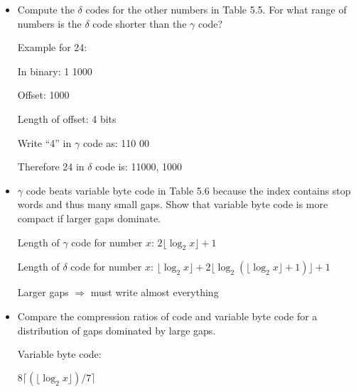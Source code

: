 \documentclass[12pt]{article}
\begin{document}
\begin{itemize}
  \item Compute the $\delta$ codes for the other numbers in Table 5.5. 
	 For what range of numbers is the $\delta$ code shorter than the $\gamma$ code? 

	 Example for 24: 

	 In binary: 1 1000

	 Offset: 1000

	 Length of offset: 4 bits

	 Write ``4'' in $\gamma$ code as: 110 00

	 Therefore 24 in $\delta$ code is: 11000, 1000
  \item $\gamma$ code beats variable byte code in Table 5.6 because the index contains stop 
	 words and thus many small gaps. 
 	 Show that variable byte code is more compact if larger gaps dominate. 

	 Length of $\gamma$ code for number $x$: $2\lfloor \log_2 x \rfloor + 1$

	 Length of $\delta$ code for number $x$: 
	 $\lfloor \log_2 x \rfloor + 
	 2 \lfloor \log_2(\lfloor \log_2 x \rfloor + 1)\rfloor + 1$

	 Larger gaps $\Rightarrow$ must write almost everything 

  \item Compare the compression ratios of code and variable byte code 
	 for a distribution of gaps dominated by large gaps.

	 Variable byte code: 

	 $8\lceil(\lfloor \log_2 x \rfloor)/7 \rceil$
\end{itemize}
\end{document}
